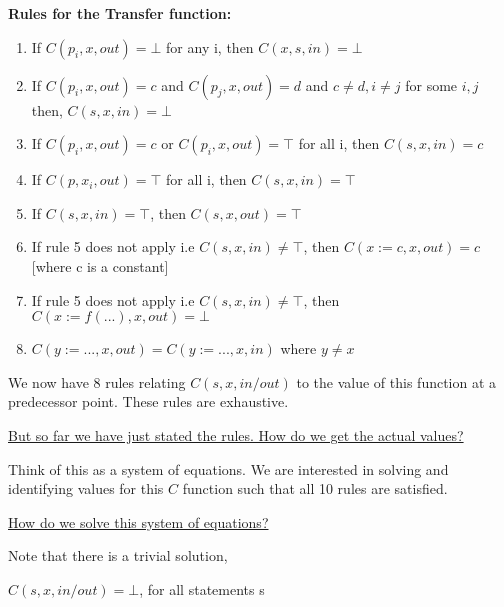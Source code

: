 \vspace{0.3cm}

\textbf{Rules for the Transfer function:}

\begin{enumerate}
    \item If $C(p_i, x, out) = \bot$ for any i, then $C(x, s, in) = \bot$
    \item If $C(p_i, x, out) = c$ and $C(p_j, x, out) = d$ and $c \neq d, i \neq j$ for some $i, j$ then, $C(s,x,in) = \bot$
    \item If $C(p_i, x, out) = c$ or $C(p_i, x, out) = \top$ for all i, then $C(s, x, in) = c$
    \item If $C(p, x_i, out) = \top$ for all i, then $C(s, x, in) = \top$
    \item If $C(s, x, in) = \top$, then $C(s, x, out) = \top$
    \item If rule 5 does not apply i.e $C(s,x,in) \neq \top$, then $C(x := c, x, out) = c$ [where c is a constant]
    \item If rule 5 does not apply i.e $C(s,x,in) \neq \top$, then $C(x := f(...), x, out) = \bot$
    \item $C(y := ..., x, out) = C(y:=..., x, in)$ where $y \neq x$
\end{enumerate}

We now have 8 rules relating $C(s, x, in/out)$ to the value of this function at a predecessor point. These rules are exhaustive.

\vspace{0.3cm}

\underline{But so far we have just stated the rules. How do we get the actual values?}

\vspace{0.3cm}

Think of this as a system of equations. We are interested in solving and identifying values for this $C$ function such that all 10 rules are satisfied.

\vspace{0.3cm}

\underline{How do we solve this system of equations?}

\vspace{0.3cm}

Note that there is a trivial solution,

\begin{center}
    $C(s, x, in/out) = \bot$, for all statements s
\end{center}

